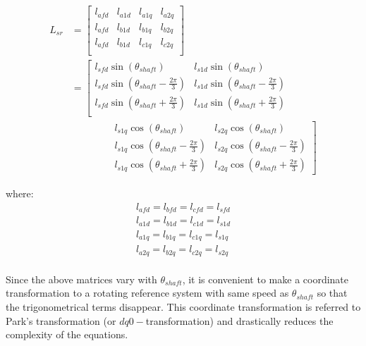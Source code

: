 \begin{equation*}
    \begin{aligned}
        L_{sr} &= 
        \begin{bmatrix}
            l_{afd} & l_{a1d} & l_{a1q} & l_{a2q}\\
            l_{afd} & l_{b1d} & l_{b1q} & l_{b2q}\\
            l_{afd} & l_{b1d} & l_{c1q} & l_{c2q}\\
        \end{bmatrix}\\
        &=
        \left[\begin{matrix}
        l_{sfd}\sin(\theta_{shaft}) & l_{s1d}\sin(\theta_{shaft})\\
        l_{sfd}\sin(\theta_{shaft}-\frac{2\pi}{3}) & l_{s1d}\sin(\theta_{shaft}-\frac{2\pi}{3})\\
        l_{sfd}\sin(\theta_{shaft}+\frac{2\pi}{3}) & l_{s1d}\sin(\theta_{shaft}+\frac{2\pi}{3})\\
        \end{matrix}\right.\\
        &\qquad\qquad
        \left.\begin{matrix}
        {}l_{s1q}\cos(\theta_{shaft}) & l_{s2q}\cos(\theta_{shaft})\\
        {}l_{s1q}\cos(\theta_{shaft}-\frac{2\pi}{3}) & l_{s2q}\cos(\theta_{shaft}-\frac{2\pi}{3})\\
        {}l_{s1q}\cos(\theta_{shaft}+\frac{2\pi}{3}) & l_{s2q}\cos(\theta_{shaft}+\frac{2\pi}{3})
        \end{matrix}\right]
    \end{aligned}
\end{equation*}

\noindent where:
\begin{equation*}
    \begin{aligned}
        l_{afd} = l_{bfd} = l_{cfd} = l_{sfd}\\
        l_{a1d} = l_{b1d} = l_{c1d} = l_{s1d}\\
        l_{a1q} = l_{b1q} = l_{c1q} = l_{s1q}\\
        l_{a2q} = l_{b2q} = l_{c2q} = l_{s2q}\\
    \end{aligned}
\end{equation*}

Since the above matrices vary with $\theta_{shaft}$, it is convenient to make a
coordinate transformation to a rotating reference system with same speed as
$\theta_{shaft}$ so that the trigonometrical terms disappear. This coordinate
transformation is referred to Park's transformation (or $dq0-$transformation)
and drastically reduces the complexity of the equations.

